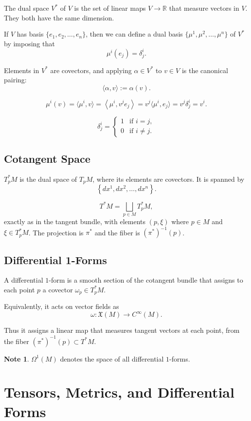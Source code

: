 \documentclass[11pt]{report}
\theoremstyle{definition}
\newtheorem{note}[definition]{Note}
\theoremstyle{plain}
\theoremstyle{remark}
\newcommand{\R}{\mathbb{R}}
\begin{document}
The dual space $V^*$ of $V$ is the set of linear maps $V\to \R$ that measure vectors in $V$. They both have the same dimension.

If $V$ has basis $\{e_1,e_2,\ldots,e_n\}$, then we can define a dual basis $\{\mu^1,\mu^2,\ldots,\mu^n\}$ of $V^*$ by imposing that
\[
\mu^i(e_j)=\delta_j^i.
\]

Elements in $V^*$ are covectors, and applying $\alpha\in V^*$ to $v\in V$ is the canonical pairing:
\[
\langle \alpha, v\rangle:=\alpha(v).
\]

\[
\mu^i(v)=\langle\mu^i,v\rangle = \left\langle\mu^i,v^j e_j\right\rangle = v^j\langle\mu^i,e_j\rangle = v^j\delta_j^i = v^i.
\]

\[
\delta_j^i=
\begin{cases}
1 & \text{if } i=j,\\
0 & \text{if } i\neq j.
\end{cases}
\]

\section{Cotangent Space}

$T_p^*M$ is the dual space of $T_pM$, where its elements are covectors. It is spanned by
\[
\left\{dx^1,dx^2,\dots,dx^n\right\}.
\]

\[
T^*M=\bigsqcup_{p\in M} T_p^*M,
\]
exactly as in the tangent bundle, with elements $(p,\xi)$ where $p\in M$ and $\xi\in T_p^*M$. The projection is $\pi^*$ and the fiber is $(\pi^*)^{-1}(p)$.

\section{Differential 1-Forms}

A differential $1$-form is a smooth section of the cotangent bundle that assigns to each point $p$ a covector $\omega_p\in T_p^*M$.

Equivalently, it acts on vector fields as
\[
\omega:\mathfrak X(M)\to C^\infty(M).
\]

Thus it assigns a linear map that measures tangent vectors at each point, from the fiber $(\pi^*)^{-1}(p)\subset T^*M$.

\begin{note}
$\Omega^1(M)$ denotes the space of all differential $1$-forms.
\end{note}

\chapter{Tensors, Metrics, and Differential Forms}
\end{document}
